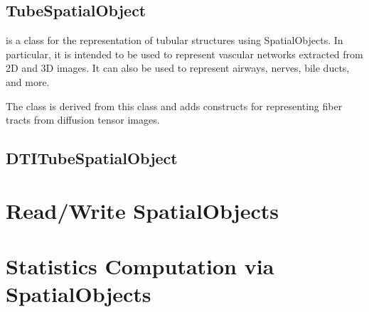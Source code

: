 \subsection{TubeSpatialObject}%
\label{sec:TubeSpatialObject}

 is a class for the representation
of tubular structures using SpatialObjects.  In particular, it is intended
to be used to represent vascular networks extracted from 2D and 3D images.
It can also be used to represent airways, nerves, bile ducts, and more.

 The class  is derived from this class
and adds constructs for representing fiber tracts from diffusion tensor images.




\subsection{DTITubeSpatialObject}%
\label{sec:DTITubeSpatialObject}



\section{Read/Write SpatialObjects}%
\label{sec:ReadWriteSpatialObjects}



\section{Statistics Computation via SpatialObjects}%
\label{sec:SpatialObjectToImageStatisticsCalculator}

